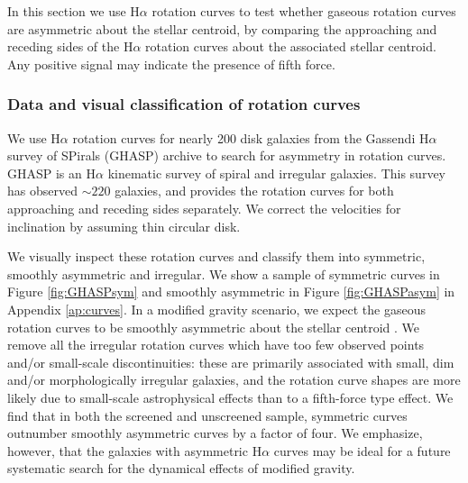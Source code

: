 \documentclass[useAMS,usenatbib,twocolumn]{mn2e}
\newcommand{\ha}{H$\alpha$}
\begin{document}
In this section we use \ha{} rotation curves to test
whether gaseous rotation curves are asymmetric about the stellar centroid,
by comparing the approaching and receding sides of the \ha{} rotation curves
about the associated stellar centroid. Any
positive signal may indicate the presence of fifth force.

\subsubsection{Data and visual classification of rotation curves}
We use \ha{} rotation curves for nearly 200 disk
galaxies from  the Gassendi \ha{} survey of SPirals (GHASP) archive
\citep[see][and references therein]{epinat08a} to search for asymmetry in
rotation curves. GHASP is an \ha{} kinematic survey of spiral and
irregular galaxies. This survey has observed $\sim 220$ galaxies, and
provides the rotation curves for both
approaching and receding sides separately. We correct the velocities for
inclination by assuming thin circular disk.

We visually inspect these rotation curves and classify them into symmetric,
smoothly asymmetric and irregular. We show a sample of symmetric curves in
Figure
\ref{fig:GHASPsym} and smoothly asymmetric in Figure \ref{fig:GHASPasym} in
Appendix \ref{ap:curves}. In a modified gravity scenario, we expect the gaseous
rotation curves to be smoothly asymmetric about the stellar
centroid \citep{bhuvjake2011}.
We remove all the irregular rotation curves which have too few
observed points and/or small-scale discontinuities: these are primarily
associated with small, dim and/or morphologically irregular galaxies, and the
rotation curve shapes are more likely due to small-scale astrophysical
effects than to a fifth-force type effect.
We find that in both the screened and unscreened sample, symmetric curves
outnumber smoothly asymmetric curves by a factor of four.
We emphasize, however, that the galaxies with asymmetric \ha{} curves may
be ideal for a future systematic search for the dynamical effects of
modified gravity.
\end{document}
